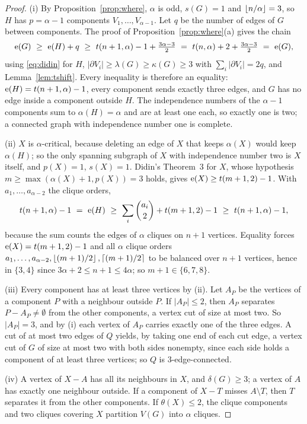 \begin{proof}
(i) By Proposition~\ref{prop:where}, $\alpha$ is odd, $s(G)=1$ and $\left\lfloor n/\alpha\right\rfloor=3$, so $H$ has $p=\alpha-1$
components $V_1,\dots,V_{\alpha-1}$. Let $q$ be the number of edges of $G$ between components. The proof of
Proposition~\ref{prop:where}(a) gives the chain
\[
\e(G)\ \ge\ \e(H)+q\ \ge\ t(n+1,\alpha)-1+\tfrac{3\alpha-3}{2}\ =\ t(n,\alpha)+2+\tfrac{3\alpha-3}{2}\ =\ \e(G),
\]
using \eqref{eq:didin} for $H$, $|\partial V_i|\ge\lambda(G)\ge\kappa(G)\ge3$ with $\sum_i|\partial V_i|=2q$, and
Lemma~\ref{lem:tshift}. Every inequality is therefore an equality: $\mathrm{e}(H)=t(n+1,\alpha)-1$, every component sends
exactly three edges, and $G$ has no edge inside a component outside $H$. The independence numbers of the
$\alpha-1$ components sum to $\alpha(H)=\alpha$ and are at least one each, so exactly one is two; a connected graph
with independence number one is complete.

(ii) $X$ is $\alpha$-critical, because deleting an edge of $X$ that keeps $\alpha(X)$ would keep $\alpha(H)$; so the
only spanning subgraph of $X$ with independence number two is $X$ itself, and $p(X)=1$, $s(X)=1$. Didin's Theorem~3
for $X$, whose hypothesis $m\ge\max(\alpha(X)+1,p(X))=3$ holds, gives $\mathrm{e}(X)\ge t(m+1,2)-1$. With
$a_1,\dots,a_{\alpha-2}$ the clique orders,
\[
t(n+1,\alpha)-1\ =\ \e(H)\ \ge\ \sum_i\binom{a_i}{2}+t(m+1,2)-1\ \ge\ t(n+1,\alpha)-1,
\]
because the sum counts the edges of $\alpha$ cliques on $n+1$ vertices. Equality forces $\mathrm{e}(X)=t(m+1,2)-1$ and all
$\alpha$ clique orders $a_1,\dots,a_{\alpha-2},\left\lfloor (m+1)/2\right\rfloor,\left\lceil (m+1)/2\right\rceil$ to be balanced over $n+1$ vertices,
hence in $\{3,4\}$ since $3\alpha+2\le n+1\le4\alpha$; so $m+1\in\{6,7,8\}$.

(iii) Every component has at least three vertices by (ii). Let $A_P$ be the vertices of a component $P$ with a
neighbour outside $P$. If $|A_P|\le2$, then $A_P$ separates $P-A_P\neq\emptyset$ from the other components, a vertex
cut of size at most two. So $|A_P|=3$, and by (i) each vertex of $A_P$ carries exactly one of the three edges. A cut of
at most two edges of $Q$ yields, by taking one end of each cut edge, a vertex cut of $G$ of size at most two with both
sides nonempty, since each side holds a component of at least three vertices; so $Q$ is $3$-edge-connected.

(iv) A vertex of $X-A$ has all its neighbours in $X$, and $\delta(G)\ge3$; a vertex of $A$ has exactly one neighbour
outside. If a component of $X-T$ misses $A\setminus T$, then $T$ separates it from the other components. If
$\theta(X)\le2$, the clique components and two cliques covering $X$ partition $V(G)$ into $\alpha$ cliques.
\end{proof}

